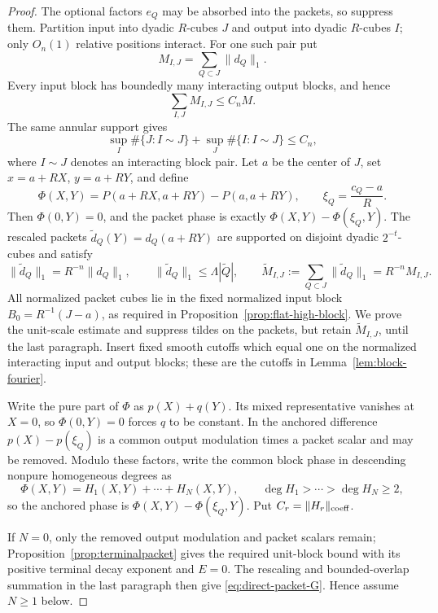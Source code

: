 \documentclass[11pt]{article}
\numberwithin{equation}{section}
\theoremstyle{remark}
\theoremstyle{definition}
\newcommand{\norm}[1]{\lVert #1\rVert}
\begin{document}
\begin{proof}
The optional factors $e_Q$ may be absorbed into the packets, so suppress
them.  Partition input into dyadic $R$-cubes $J$ and output into dyadic
$R$-cubes $I$; only $O_n(1)$ relative positions interact.  For one such
pair put
\[
 M_{I,J}=\sum_{Q\subset J}\norm{d_Q}_1.
\]
Every input block has boundedly many interacting output blocks, and hence
\begin{equation}\label{eq:direct-block-overlap}
 \sum_{I,J}M_{I,J}\le C_nM.
\end{equation}
The same annular support gives
\[
 \sup_I\#\{J:I\sim J\}+
 \sup_J\#\{I:I\sim J\}\le C_n,
\]
where $I\sim J$ denotes an interacting block pair.
Let $a$ be the center of $J$, set $x=a+RX$, $y=a+RY$, and define
\begin{equation}\label{eq:direct-normalized-phase}
 \Phi(X,Y)=P(a+RX,a+RY)-P(a,a+RY),
 \qquad \xi_Q=\frac{c_Q-a}{R}.
\end{equation}
Then $\Phi(0,Y)=0$, and the packet phase is exactly
$\Phi(X,Y)-\Phi(\xi_Q,Y)$.  The rescaled packets
$\widetilde d_Q(Y)=d_Q(a+RY)$ are supported on disjoint dyadic
$2^{-t}$-cubes and satisfy
\begin{equation}\label{eq:direct-rescaled-data}
 \norm{\widetilde d_Q}_1=R^{-n}\norm{d_Q}_1,
 \qquad \norm{\widetilde d_Q}_1\le\Lambda|\widetilde Q|,
 \qquad \widetilde M_{I,J}:=\sum_{Q\subset J}\norm{\widetilde d_Q}_1
 =R^{-n}M_{I,J}.
\end{equation}
All normalized packet cubes lie in the fixed normalized input block
$B_0=R^{-1}(J-a)$, as required in
Proposition~\ref{prop:flat-high-block}.
We prove the unit-scale estimate and suppress tildes on the packets, but
retain $\widetilde M_{I,J}$, until the last paragraph.  Insert fixed
smooth cutoffs which equal one on the normalized interacting input and
output blocks; these are the cutoffs in
Lemma~\ref{lem:block-fourier}.

Write the pure part of $\Phi$ as $p(X)+q(Y)$.  Its mixed representative
vanishes at $X=0$, so $\Phi(0,Y)=0$ forces $q$ to be constant.  In the
anchored difference $p(X)-p(\xi_Q)$ is a common output modulation times a
packet scalar and may be removed.  Modulo these factors, write the common
block phase in descending nonpure homogeneous degrees as
\[
 \Phi(X,Y)=H_1(X,Y)+\cdots+H_N(X,Y),
 \qquad \deg H_1>\cdots>\deg H_N\ge2,
\]
so the anchored phase is $\Phi(X,Y)-\Phi(\xi_Q,Y)$.  Put
$C_r=\norm{H_r}_{\rm coeff}$.

If $N=0$, only the removed output modulation and packet scalars remain;
Proposition~\ref{prop:terminalpacket} gives the required unit-block bound
with its positive terminal decay exponent and $E=0$.  The rescaling and
bounded-overlap summation in the last paragraph then give
\eqref{eq:direct-packet-G}.  Hence assume $N\ge1$ below.


\end{proof}
\end{document}
